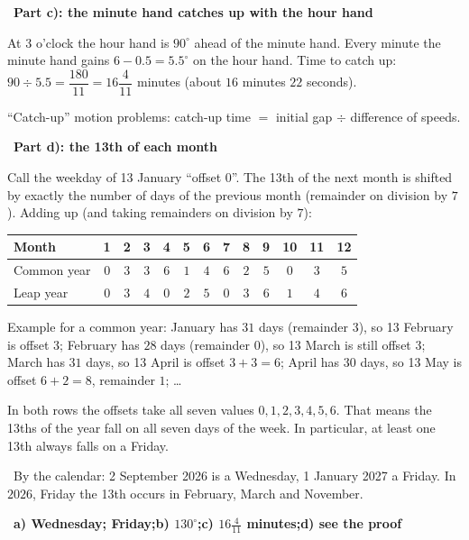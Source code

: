 \documentclass[11pt]{article}
\providecommand{\AnsWord}{Đáp số}
\newcommand{\ans}[1]{\par\smallskip{\bfseries\color{tmGreen!88!black}\AnsWord:}\ {\bfseries\color{AnsRed}#1}\par}
\newcommand{\step}[2]{\par\smallskip\noindent{\bfseries\color{tmBlue!85!black}\StepWord~#1.}\ {\bfseries #2}\par\nopagebreak}
\newcommand{\verify}[1]{\par\smallskip\noindent{\bfseries\color{tmGreen!80!black}\faCheckCircle\ \CheckWord}\ #1\par}
\def\AnsWord{Answer}
\def\StepWord{Step}
\def\CheckWord{Check:}
\begin{document}
{\step{4}{Part c): the minute hand catches up with the hour hand}
At 3 o'clock the hour hand is $90^\circ$ ahead of the minute hand. Every minute the minute hand gains $6 - 0.5 = 5.5^\circ$ on the hour
hand. Time to catch up: $90 \div 5.5 = \dfrac{180}{11} = 16\dfrac{4}{11}$ minutes (about $16$ minutes $22$ seconds).
\begin{recallbox}``Catch-up'' motion problems: catch-up time $=$ initial gap $\div$ difference of speeds.\end{recallbox}
\step{5}{Part d): the 13th of each month}
Call the weekday of 13 January ``offset $0$''. The 13th of the next month is shifted by exactly the number of days of the previous month
(remainder on division by $7$). Adding up (and taking remainders on division by $7$):
\begin{center}\scriptsize
\setlength{\tabcolsep}{3.2pt}
\begin{tabular}{|l|c|c|c|c|c|c|c|c|c|c|c|c|}
\hline
\rowcolor{tmBlue!10} Month & 1 & 2 & 3 & 4 & 5 & 6 & 7 & 8 & 9 & 10 & 11 & 12\\ \hline
Common year & $0$ & $3$ & $3$ & $6$ & $1$ & $4$ & $6$ & $2$ & $5$ & $0$ & $3$ & $5$\\ \hline
Leap year & $0$ & $3$ & $4$ & $0$ & $2$ & $5$ & $0$ & $3$ & $6$ & $1$ & $4$ & $6$\\ \hline
\end{tabular}
\end{center}
Example for a common year: January has $31$ days (remainder $3$), so 13 February is offset $3$; February has $28$ days (remainder $0$),
so 13 March is still offset $3$; March has $31$ days, so 13 April is offset $3 + 3 = 6$; April has $30$ days, so 13 May is offset
$6 + 2 = 8$, remainder $1$; \dots
\begin{proofbox}In both rows the offsets take all seven values $0, 1, 2, 3, 4, 5, 6$. That means the 13ths of the year fall on all seven
days of the week. In particular, at least one 13th always falls on a Friday.\end{proofbox}
\verify{By the calendar: 2 September 2026 is a Wednesday, 1 January 2027 a Friday. In $2026$, Friday the 13th occurs in February, March
and November.}
\ans{a) Wednesday; Friday;\quad b) $130^\circ$;\quad c) $16\frac{4}{11}$ minutes;\quad d) see the proof}
}

\end{document}

